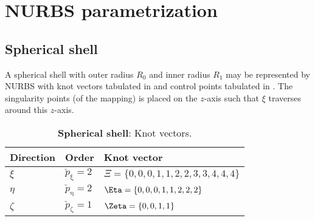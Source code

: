 \section{NURBS parametrization}
\subsection{Spherical shell}
\label{Sec2:NURBSdata}
A spherical shell with outer radius $R_0$ and inner radius $R_1$ may be represented by NURBS with knot vectors tabulated in  and control points tabulated in . The singularity points (of the mapping) is placed on the $z$-axis such that $\xi$ traverses around this $z$-axis.
\begin{table}
	\centering
	\caption{\textbf{Spherical shell}: Knot vectors.}
	\label{tab:sphericalShellKnotvectors}
	\begin{tabular}{l l l}
		\toprule
		Direction	& 	Order	& 	Knot vector\\
		\hline
		$\xi$		&	$\check{p}_\upxi=2$	&	$\Xi = \{0, 0, 0, 1, 1, 2, 2, 3, 3, 4, 4, 4\}$	\\
		$\eta$		&	$\check{p}_\upeta=2$	&	$\Eta = \{0, 0, 0, 1, 1, 2, 2, 2\}$					\\
		$\zeta$		&	$\check{p}_\upzeta=1$	&	$\Zeta = \{0, 0, 1, 1\}$						\\
		\bottomrule
	\end{tabular}
\end{table}
